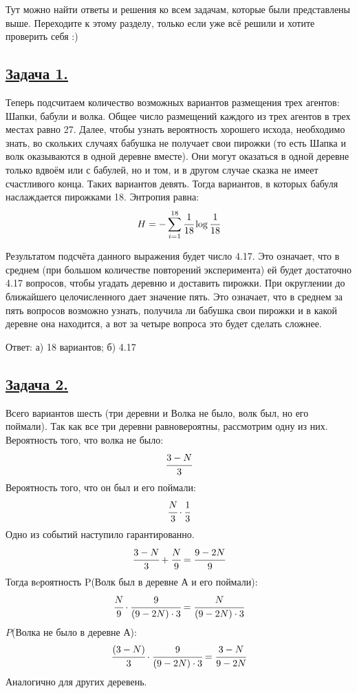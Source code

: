 Тут можно найти ответы и решения ко всем задачам, которые были представлены выше. Переходите к этому разделу, только если уже всё решили и хотите проверить себя :)

\subsection*{\hyperref[sec:problem1]{Задача 1.}}\label{sec:sol_problem1}
Теперь подсчитаем количество возможных вариантов размещения трех агентов: Шапки, бабули и волка. Общее число размещений каждого из трех агентов в трех местах равно 27. 
Далее, чтобы узнать вероятность хорошего исхода, необходимо знать, во скольких случаях бабушка не получает свои пирожки (то есть Шапка и волк оказываются в одной деревне вместе). Они могут оказаться в одной деревне только вдвоём или с бабулей, но и том, и в другом случае сказка не имеет счастливого конца. Таких вариантов девять. Тогда вариантов, в которых бабуля наслаждается пирожками 18.
Энтропия равна:
\[H=-\sum\limits_{i=1}^{18}  \cfrac{1}{18}\log \cfrac{1}{18} \]

Результатом подсчёта данного выражения будет число 4.17. Это означает, что в среднем (при большом количестве повторений эксперимента) ей будет достаточно 4.17 вопросов, чтобы угадать деревню и доставить пирожки. При округлении до ближайшего целочисленного дает значение пять. Это означает, что в среднем за пять вопросов возможно узнать, получила ли бабушка свои пирожки и в какой деревне она находится, а вот за четыре вопроса это будет сделать сложнее. 

Ответ: а) 18 вариантов; б) 4.17


\subsection*{\hyperref[sec:problem2]{Задача 2.}}\label{sec:sol_problem2}

Всего вариантов шесть (три деревни и {Волка не было, волк был, но его поймали}). Так как все три деревни равновероятны, рассмотрим одну из них. Вероятность того, что волка не было: \[\cfrac{3-N}{3} \]
Вероятность того, что он был и его поймали: \[\cfrac{N}{3}\cdot \cfrac{1}{3} \]
Одно из событий наступило гарантированно. 
\[\cfrac{3-N}{3} + \cfrac{N}{9} = \cfrac{9-2N}{9} \]
Тогда вeроятность P(Волк был в деревне А и его поймали):
\[\cfrac{N}{9}\cdot \cfrac{9}{(9-2N)\cdot3} =\cfrac{N}{(9-2N)\cdot3} \] 
$P$(Волка не было в деревне А):
\[\cfrac{(3-N)}{3}\cdot \cfrac{9}{(9-2N)\cdot3}=\cfrac{3-N}{9-2N}\]
Аналогично для других деревень.

